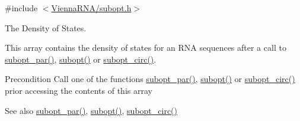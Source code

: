 {\ttfamily \#include $<$\mbox{\hyperlink{subopt_8h}{Vienna\+R\+N\+A/subopt.\+h}}$>$}



The Density of States. 

This array contains the density of states for an R\+NA sequences after a call to \mbox{\hyperlink{group__subopt__wuchty_gaa1e1e7031a948ebcb39a9d58d1e9842c}{subopt\+\_\+par()}}, \mbox{\hyperlink{group__subopt__wuchty_ga700f662506a233e42dd7fda74fafd40e}{subopt()}} or \mbox{\hyperlink{group__subopt__wuchty_ga8634516e4740e0b6c9a46d2bae940340}{subopt\+\_\+circ()}}.

\begin{DoxyPrecond}{Precondition}
Call one of the functions \mbox{\hyperlink{group__subopt__wuchty_gaa1e1e7031a948ebcb39a9d58d1e9842c}{subopt\+\_\+par()}}, \mbox{\hyperlink{group__subopt__wuchty_ga700f662506a233e42dd7fda74fafd40e}{subopt()}} or \mbox{\hyperlink{group__subopt__wuchty_ga8634516e4740e0b6c9a46d2bae940340}{subopt\+\_\+circ()}} prior accessing the contents of this array 
\end{DoxyPrecond}
\begin{DoxySeeAlso}{See also}
\mbox{\hyperlink{group__subopt__wuchty_gaa1e1e7031a948ebcb39a9d58d1e9842c}{subopt\+\_\+par()}}, \mbox{\hyperlink{group__subopt__wuchty_ga700f662506a233e42dd7fda74fafd40e}{subopt()}}, \mbox{\hyperlink{group__subopt__wuchty_ga8634516e4740e0b6c9a46d2bae940340}{subopt\+\_\+circ()}} 
\end{DoxySeeAlso}
